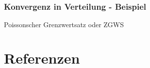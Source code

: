 \documentclass{beamer}
\begin{document}
\begin{frame}
\frametitle{Konvergenz in Verteilung - Beispiel}
Poissonscher Grenzwertsatz oder ZGWS
\end{frame}

\begin{frame}
\frametitle{}
\end{frame}


\section*{Referenzen}

\end{document}
